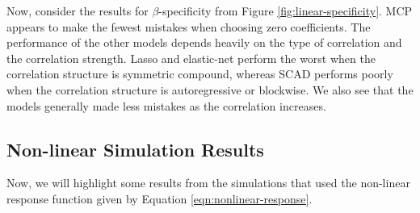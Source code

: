 \documentclass{article}
\begin{document}
	Now, consider the results for $\beta$-specificity from Figure \ref{fig:linear-specificity}. MCP appears to make the fewest mistakes when choosing zero coefficients. The performance of the other models depends heavily on the type of correlation and the correlation strength. Lasso and elastic-net perform the worst when the correlation structure is symmetric compound, whereas SCAD performs poorly when the correlation structure is autoregressive or blockwise. We also see that the models generally made less mistakes as the correlation increases.
	
	\subsection{Non-linear Simulation Results}
	Now, we will highlight some results from the simulations that used the non-linear response function given by Equation \ref{eqn:nonlinear-response}.
	
\end{document}
